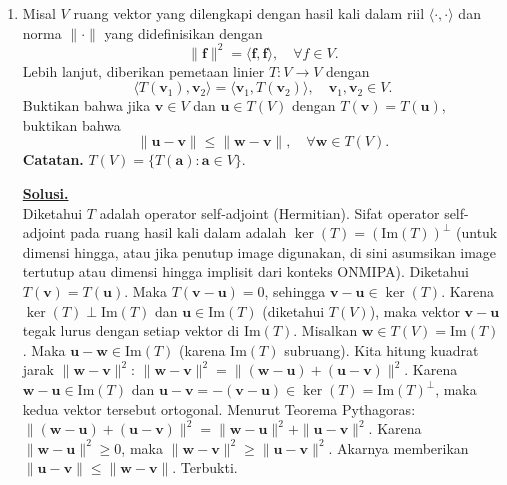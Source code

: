 \documentclass[12pt,twoside]{article}
\newenvironment{solution}
{
	\par\noindent\textbf{\underline{Solusi.}}\\
}
{
	\par
}
\begin{document}
\begin{enumerate}
  \item Misal $V$ ruang vektor yang dilengkapi dengan hasil kali dalam riil $\langle \cdot, \cdot \rangle$ dan norma $\|\cdot\|$ yang didefinisikan dengan
        \[
          \|\textbf{f}\|^2 = \langle \textbf{f}, \textbf{f} \rangle, \quad \forall f \in V.
        \]
        Lebih lanjut, diberikan pemetaan linier $T : V \to V$ dengan
        \[
          \langle T(\mathbf{v}_1), \mathbf{v}_2 \rangle = \langle \mathbf{v}_1, T(\mathbf{v}_2) \rangle, \quad \mathbf{v}_1, \mathbf{v}_2 \in V.
        \]
        Buktikan bahwa jika $\textbf{v} \in V$ dan $\textbf{u} \in T(V)$ dengan $T(\textbf{v}) = T(\textbf{u})$, buktikan bahwa
        \[
          \|\textbf{u} - \textbf{v}\| \leq \|\textbf{w} - \textbf{v}\|, \quad \forall \textbf{w} \in T(V).
        \]
        \textbf{Catatan.} $T(V) = \{T(\textbf{a}) : \textbf{a} \in V\}$.
        \begin{solution}
          Diketahui $T$ adalah operator self-adjoint (Hermitian).
          Sifat operator self-adjoint pada ruang hasil kali dalam adalah $\ker(T) = (\text{Im}(T))^\perp$ (untuk dimensi hingga, atau jika penutup image digunakan, di sini asumsikan image tertutup atau dimensi hingga implisit dari konteks ONMIPA).
          Diketahui $T(\mathbf{v}) = T(\mathbf{u})$.
          Maka $T(\mathbf{v} - \mathbf{u}) = 0$, sehingga $\mathbf{v} - \mathbf{u} \in \ker(T)$.
          Karena $\ker(T) \perp \text{Im}(T)$ dan $\mathbf{u} \in \text{Im}(T)$ (diketahui $T(V)$), maka vektor $\mathbf{v} - \mathbf{u}$ tegak lurus dengan setiap vektor di $\text{Im}(T)$.
          Misalkan $\mathbf{w} \in T(V) = \text{Im}(T)$.
          Maka $\mathbf{u} - \mathbf{w} \in \text{Im}(T)$ (karena $\text{Im}(T)$ subruang).
          Kita hitung kuadrat jarak $\|\mathbf{w} - \mathbf{v}\|^2$:
          $\|\mathbf{w} - \mathbf{v}\|^2 = \|(\mathbf{w} - \mathbf{u}) + (\mathbf{u} - \mathbf{v})\|^2$.
          Karena $\mathbf{w} - \mathbf{u} \in \text{Im}(T)$ dan $\mathbf{u} - \mathbf{v} = -(\mathbf{v} - \mathbf{u}) \in \ker(T) = \text{Im}(T)^\perp$, maka kedua vektor tersebut ortogonal.
          Menurut Teorema Pythagoras:
          $\|(\mathbf{w} - \mathbf{u}) + (\mathbf{u} - \mathbf{v})\|^2 = \|\mathbf{w} - \mathbf{u}\|^2 + \|\mathbf{u} - \mathbf{v}\|^2$.
          Karena $\|\mathbf{w} - \mathbf{u}\|^2 \ge 0$, maka
          $\|\mathbf{w} - \mathbf{v}\|^2 \ge \|\mathbf{u} - \mathbf{v}\|^2$.
          Akarnya memberikan $\|\mathbf{u} - \mathbf{v}\| \le \|\mathbf{w} - \mathbf{v}\|$.
          Terbukti.
        \end{solution}
\end{enumerate}
\end{document}
